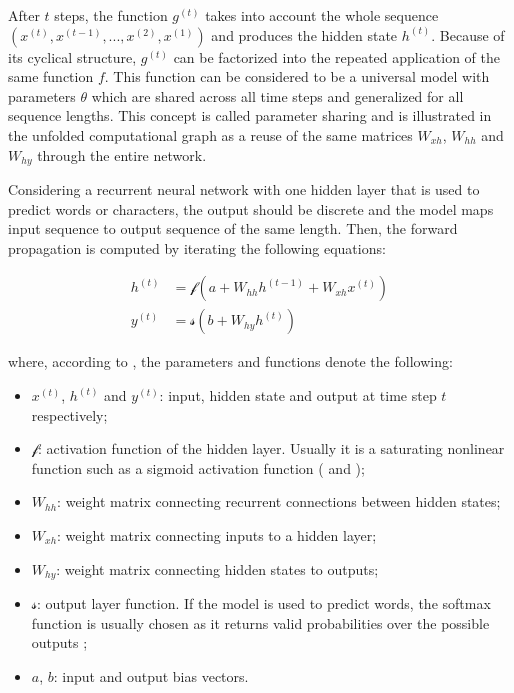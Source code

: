 \documentclass[]{krantz}
\providecommand{\tightlist}{%
  \setlength{\itemsep}{0pt}\setlength{\parskip}{0pt}}
\begin{document}
After \(t\) steps, the function \(g^{(t)}\) takes into account the whole sequence \((x^{(t)},x^{(t-1)},...,x^{(2)}, x^{(1)})\) and produces the hidden state \(h^{(t)}\). Because of its cyclical structure, \(g^{(t)}\) can be factorized into the repeated application of the same function \(f\). This function can be considered to be a universal model with parameters \(\theta\) which are shared across all time steps and generalized for all sequence lengths. This concept is called parameter sharing and is illustrated in the unfolded computational graph as a reuse of the same matrices \(W_{xh}\), \(W_{hh}\) and \(W_{hy}\) through the entire network. \citep{goodfellow2016deep}

Considering a recurrent neural network with one hidden layer that is used to predict words or characters, the output should be discrete and the model maps input sequence to output sequence of the same length. Then, the forward propagation is computed by iterating the following equations:

\begin{align}
h^{(t)} & = \mathcal{f}(a+W_{hh}h^{(t-1)}+W_{xh}x^{(t)}) \label{eq:input-to-hidden} \\
y^{(t)} & = \mathcal{s}(b+W_{hy}h^{(t)}) \label{eq:hidden-to-output} 
\end{align}

where, according to \citet{graves2013generating}, the parameters and functions denote the following:

\begin{itemize}
\tightlist
\item
  \(x^{(t)}\), \(h^{(t)}\) and \(y^{(t)}\): input, hidden state and output at time step \(t\) respectively;
\item
  \(\mathcal{f}\): activation function of the hidden layer. Usually it is a saturating nonlinear function such as a sigmoid activation function ( \citet{sutskever2014sequence} and \citet{mikolov2010recurrent});\\
\item
  \(W_{hh}\): weight matrix connecting recurrent connections between hidden states;\\
\item
  \(W_{xh}\): weight matrix connecting inputs to a hidden layer;\\
\item
  \(W_{hy}\): weight matrix connecting hidden states to outputs;\\
\item
  \(\mathcal{s}\): output layer function. If the model is used to predict words, the softmax function is usually chosen as it returns valid probabilities over the possible outputs \citep{mikolov2010recurrent};\\
\item
  \(a\), \(b\): input and output bias vectors.
\end{itemize}
\end{document}
